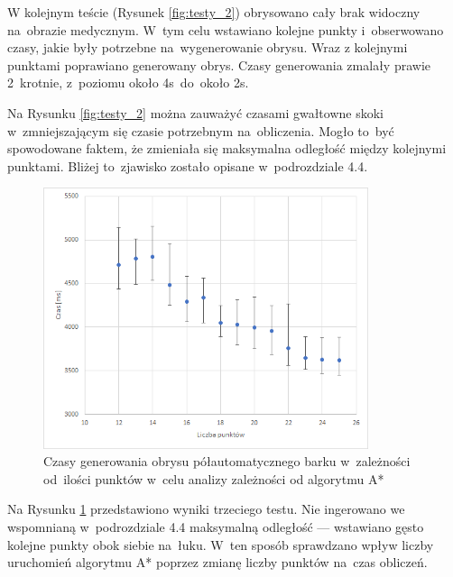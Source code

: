 \documentclass[a4paper,11pt,twoside,openright]{report}
\theoremstyle{definition}
\begin{document}
\bigskip

W kolejnym teście (Rysunek \ref{fig:testy_2}) obrysowano
cały brak widoczny na~obrazie medycznym. W~tym celu wstawiano kolejne
punkty i~obserwowano czasy, jakie były potrzebne na~wygenerowanie obrysu. Wraz z
kolejnymi punktami poprawiano generowany obrys. Czasy generowania zmalały prawie 2~krotnie, z~poziomu
około 4s~do~około 2s.



Na Rysunku \ref{fig:testy_2} można zauważyć czasami gwałtowne skoki w~zmniejszającym
się czasie potrzebnym na~obliczenia. Mogło to~być spowodowane faktem, że zmieniała
się maksymalna odległość między kolejnymi punktami. Bliżej to~zjawisko zostało
opisane w~podrozdziale 4.4.

\begin{figure}[h!]
	\center
	\includegraphics[width=0.85\textwidth]{150}
	\caption{Czasy generowania obrysu półautomatycznego barku w~zależności od~ilości punktów 
	w~celu analizy zależności od algorytmu A*}
    	\label{fig:testy_3}
\end{figure}

Na Rysunku \ref{fig:testy_3} przedstawiono wyniki trzeciego testu. Nie ingerowano
we wspomnianą w~podrozdziale 4.4 maksymalną odległość --- wstawiano gęsto kolejne
punkty obok siebie na~łuku. W~ten sposób sprawdzano wpływ liczby uruchomień
algorytmu A* poprzez zmianę liczby punktów na~czas obliczeń.
\end{document}
